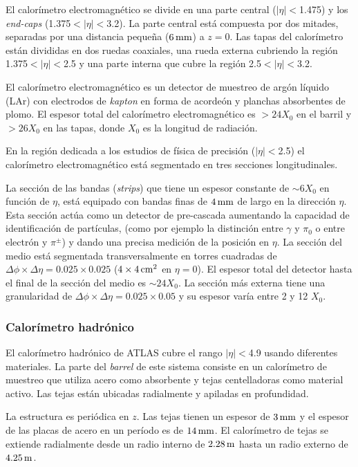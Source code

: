El calorímetro electromagnético \cite{caloemTDR} se divide en una parte central
($|\eta|<$1.475) y los \emph{end-caps} (1.375$<|\eta|<$3.2). La parte central
está compuesta por dos mitades, separadas por una
distancia pequeña ($\unit[6]{mm}$) a $z = 0$. Las tapas del calorímetro están divididas en
dos ruedas coaxiales, una rueda externa cubriendo la región 1.375$<|\eta|<$2.5 y
una parte interna que cubre la región 2.5$<|\eta|<$3.2.

El calorímetro electromagnético es un detector de muestreo de argón líquido
(LAr) con electrodos de \emph{kapton} en forma de acordeón y planchas absorbentes de
plomo. El espesor total del calorímetro electromagnético es $>24 X_0$ en el
barril y $>26 X_0$ en las tapas, donde $X_0$ es la longitud de radiación.

En la región dedicada a los estudios de física de precisión ($|\eta|<$2.5) el
calorímetro electromagnético está segmentado en tres secciones longitudinales.

La sección de las bandas (\emph{strips}) que tiene un espesor constante de
$\sim 6 X_0$ en función de $\eta$, está equipado con bandas finas de $\unit[4]{mm}$ de
largo en la dirección $\eta$. Esta sección actúa como un detector de pre-cascada
aumentando la capacidad de identificación de partículas,
(como por ejemplo la distinción entre $\gamma$ y $\pi_0$ o entre electrón y
$\pi^\pm$) y dando una precisa medición de la posición en $\eta$.
La sección del medio está segmentada transversalmente en torres cuadradas de
$\Delta \phi \times \Delta \eta = 0.025 \times 0.025$ ($4 \times \unit[4]{cm^2}$ en
$\eta=0$). El espesor total del detector hasta el final de la sección del medio
es $\sim 24 X_0$.
La sección más externa tiene una granularidad de
$\Delta\phi\times\Delta\eta = 0.025 \times 0.05$ y su espesor varía entre 2 y 12
$X_0$.


\subsubsection{Calorímetro hadrónico}

El calorímetro hadrónico de ATLAS \cite{calohadTDR} cubre el rango $|\eta|<$4.9
usando diferentes materiales.
La parte del \emph{barrel} de este sistema consiste en un calorímetro de muestreo que
utiliza acero como absorbente y tejas centelladoras como material activo. Las
tejas están ubicadas radialmente y apiladas en profundidad.

La estructura es periódica en $z$. Las tejas tienen un espesor de $\unit[3]{mm}$ y el
espesor de las placas de acero en un período es de $\unit[14]{mm}$.
El calorímetro de tejas se extiende radialmente desde un radio interno de $\unit[2.28]{m}$
hasta un radio externo de $\unit[4.25]{m}$.

